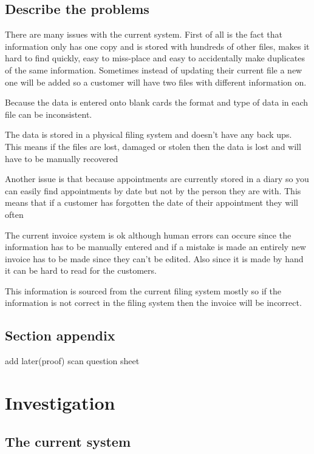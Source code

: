 \documentclass{article}
\begin{document}
	\subsection{Describe the problems}
	
		There are many issues with the current system. First of all is the fact that information only has one copy and is stored with hundreds of other files, makes it hard to find quickly, 			easy to miss-place and easy to accidentally make duplicates of the same information. 
		Sometimes instead of updating their current file a new one will be added so a customer will have two files with different information on.

		Because the data is entered onto blank cards the format and type of data in each file can be inconsistent.

		The data is stored in a physical filing system and doesn't have any back ups. This means if the files are lost, damaged or stolen then the data is lost and will have to be manually 			recovered
		

		Another issue is that because appointments are currently stored in a diary so you can easily find appointments by date but not by the person they are with. This means that if a 			customer has forgotten the date of their appointment they will often

		The current invoice system is ok although human errors can occure since the information has to be manually entered and if a mistake is made an entirely new invoice has to be 			made since they can't be edited. Also since it is made by hand it can be hard to read for the customers.

This information is sourced from the current filing system
		mostly so if the information is not correct in the filing system then the invoice will be incorrect.


	\subsection{Section appendix}
		add later(proof) scan question sheet


\section{Investigation}

	\subsection{The current system}
\end{document}
